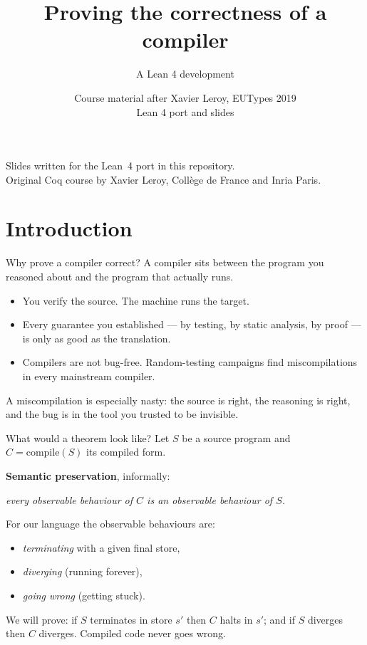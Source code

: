 \documentclass[aspectratio=169,10pt]{beamer}
\title{Proving the correctness of a compiler}
\subtitle{A Lean 4 development}
\author{Course material after Xavier Leroy, EUTypes 2019\\{\small Lean 4 port and slides}}
\date{}
\begin{document}
\begin{frame}[plain]
  \titlepage
  \begin{center}\small
  Slides written for the Lean~4 port in this repository.\\
  Original Coq course by Xavier Leroy, Collège de France and Inria Paris.
  \end{center}
\end{frame}

\section{Introduction}

\begin{frame}{Why prove a compiler correct?}
A compiler sits between the program you reasoned about and the program that
actually runs.
\medskip

\begin{itemize}
\item You verify the source. The machine runs the target.
\item Every guarantee you established --- by testing, by static analysis, by
      proof --- is only as good as the translation.
\item Compilers are not bug-free. Random-testing campaigns find miscompilations
      in every mainstream compiler.
\end{itemize}
\medskip

A miscompilation is especially nasty: the source is right, the reasoning is
right, and the bug is in the tool you trusted to be invisible.
\end{frame}

\begin{frame}{What would a theorem look like?}
Let $S$ be a source program and $C = \mathrm{compile}(S)$ its compiled form.
\medskip

\textbf{Semantic preservation}, informally:
\begin{center}
\emph{every observable behaviour of $C$ is an observable behaviour of $S$.}
\end{center}
\medskip

For our language the observable behaviours are:
\begin{itemize}
\item \emph{terminating} with a given final store,
\item \emph{diverging} (running forever),
\item \emph{going wrong} (getting stuck).
\end{itemize}
\medskip

We will prove: if $S$ terminates in store $s'$ then $C$ halts in $s'$;
and if $S$ diverges then $C$ diverges.  Compiled code never goes wrong.
\end{frame}
\end{document}
